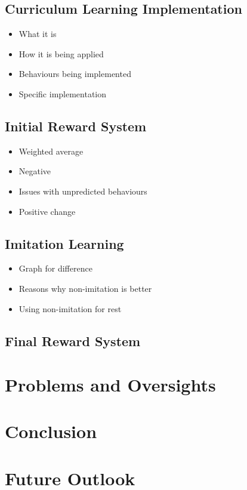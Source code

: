 \documentclass{article}
\begin{document}
\subsection{Curriculum Learning Implementation}
\begin{itemize}
    \item What it is
    \item How it is being applied
    \item Behaviours being implemented
    \item Specific implementation
\end{itemize}

\subsection{Initial Reward System}
\begin{itemize}
    \item Weighted average
    \item Negative
    \item Issues with unpredicted behaviours
    \item Positive change
\end{itemize}

\subsection{Imitation Learning}
\begin{itemize}
    \item Graph for difference
    \item Reasons why non-imitation is better
    \item Using non-imitation for rest
\end{itemize}

\subsection{Final Reward System}
\lipsum[2][1]

\section{Problems and Oversights}
\lipsum[2][1]

\section{Conclusion}
\lipsum[2][1]

\section{Future Outlook}
\lipsum[2][1]
\end{document}
